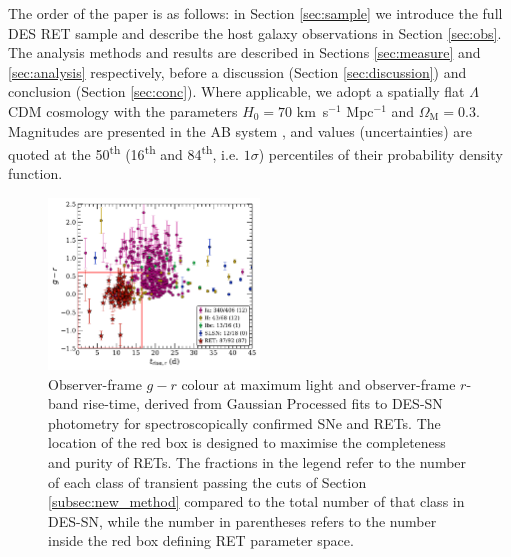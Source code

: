 \documentclass[fleqn,usenatbib,]{mnras}
\begin{document}
The order of the paper is as follows: in Section \ref{sec:sample} we introduce the full DES RET sample and describe the host galaxy observations in Section \ref{sec:obs}. The analysis methods and results are described in Sections \ref{sec:measure} and \ref{sec:analysis} respectively, before a discussion (Section \ref{sec:discussion}) and conclusion (Section \ref{sec:conc}).
Where applicable, we adopt a spatially flat $\Lambda$CDM cosmology with the parameters $H_0=70$ km~s$^{-1}$ Mpc$^{-1}$ and $\Omega_{\textrm{M}}=0.3$. Magnitudes are presented in the AB system \citep{Oke1983}, and values (uncertainties) are quoted at the 50\textsuperscript{th} (16\textsuperscript{th} and 84\textsuperscript{th}, i.e. $1\sigma$) percentiles of their probability density function.

\begin{figure}
\includegraphics[width=0.5\textwidth]{figs/spec_gr_trise_r_GP5_new_colorscheme.pdf}
\caption{Observer-frame $g-r$ colour at maximum light and observer-frame $r$-band rise-time, derived from Gaussian Processed fits to DES-SN photometry for spectroscopically confirmed SNe and  RETs. The location of the red box is designed to maximise the completeness and purity of RETs. The fractions in the legend refer to the number of each class of transient passing the cuts of Section \ref{subsec:new_method} compared to the total number of that class in DES-SN, while the number in parentheses refers to the number inside the red box defining RET parameter space. 
\label{fig:selection}}
\end{figure}
\end{document}
